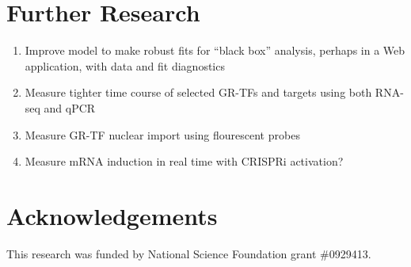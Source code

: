 \documentclass[aspb,landscape]{a0poster}
\begin{document}
\begin{multicols}{4}

  \section*{Further Research}
  
  \begin{enumerate}
  \item Improve model to make robust fits for ``black box'' analysis, perhaps in a Web application, with data and fit diagnostics
  \item Measure tighter time course of selected GR-TFs and targets using both RNA-seq and qPCR
  \item Measure GR-TF nuclear import using flourescent probes
  \item Measure mRNA induction in real time with CRISPRi activation?
  \end{enumerate}


  \nocite{*} %


  \section*{Acknowledgements}
  \small This research was funded by National Science Foundation grant \#0929413.
  
  
\end{multicols}
\end{document}
